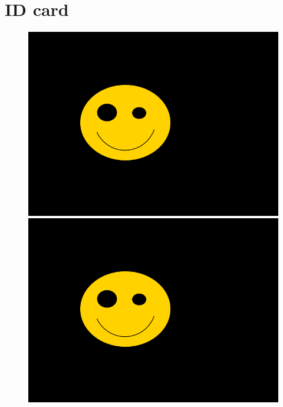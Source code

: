 
\section{ID card}
\begin{figure}[H]
\centering
\includegraphics[width=0.45\linewidth]{doc/tenant/ID_1.pdf}\\
\vspace{1cm}
\includegraphics[width=0.45\linewidth]{doc/tenant/ID_2.pdf}
\end{figure}


